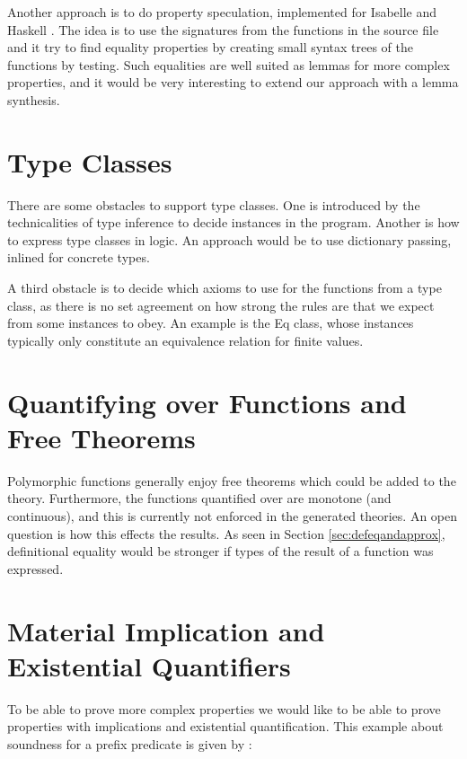 Another approach is to do property speculation, implemented for
Isabelle \citep{isacosy} and Haskell \citep{quickspec}. The idea is to
use the signatures from the functions in the source file and it try to
find equality properties by creating small syntax trees of the
functions by testing. Such equalities are well suited as lemmas for
more complex properties, and it would be very interesting to extend
our approach with a lemma synthesis.


\section{Type Classes}
\label{sec:typeclasses}

There are some obstacles to support type classes. One is introduced by
the technicalities of type inference to decide instances in the
program. Another is how to express type classes in logic. An approach
would be to use dictionary passing, inlined for concrete types.

A third obstacle is to decide which axioms to use for the functions
from a type class, as there is no set agreement on how strong the
rules are that we expect from some instances to obey. An example
is the Eq class, whose instances typically only constitute an
equivalence relation for finite values.

\section{Quantifying over Functions and Free Theorems}

Polymorphic functions generally enjoy free theorems
\citep{freetheorems} which could be added to the theory.  Furthermore,
the functions quantified over are monotone (and continuous), and this
is currently not enforced in the generated theories. An open question
is how this effects the results. As seen in Section
\ref{sec:defeqandapprox}, definitional equality would be stronger if
types of the result of a function was expressed.


\section{Material Implication and Existential Quantifiers}

To be able to prove more complex properties we would like to be able
to prove properties with implications and existential quantification.
This example about soundness for a prefix predicate is given by
\cite{smallcheck}:

